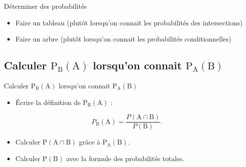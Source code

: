 \documentclass[12pt]{article}
\theoremstyle{break}
\begin{document}
\begin{method}{Déterminer des probabilités}{}
\begin{itemize}
  \item Faire un tableau (plutôt lorsqu'on connait les probabilités des intersections)
  \item Faire un arbre (plutôt lorsqu'on connait les probabilités conditionnelles)
\end{itemize}
\end{method}

\subsection{Calculer $\mathrm{P}_{\mathrm{B}}(\mathrm{A})$ lorsqu'on connait $\mathrm{P}_{\mathrm{A}}(\mathrm{B})$}
\begin{method}{Calculer $\mathrm{P}_{\mathrm{B}}(\mathrm{A})$ lorsqu'on connait $\mathrm{P}_{\mathrm{A}}(\mathrm{B})$}{}
\begin{itemize}
  \item Écrire la définition de $\mathrm{P}_{\mathrm{B}}(\mathrm{A})$ :
\end{itemize}

$$
P_{\mathrm{B}}(\mathrm{A})=\frac{P(\mathrm{A} \cap \mathrm{B})}{P(\mathrm{B})} .
$$

\begin{itemize}
  \item Calculer $\mathrm{P}(\mathrm{A} \cap \mathrm{B})$ grâce à $\mathrm{P}_{\mathrm{A}}(\mathrm{B})$.
  \item Calculer $\mathrm{P}(\mathrm{B})$ avec la formule des probabilités totales.
\end{itemize}
\end{method}
\end{document}
